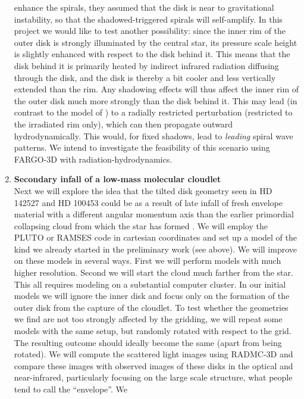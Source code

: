 \documentclass[10pt,fleqn,twoside]{article}
\begin{document}
\begin{enumerate}
  enhance the spirals, they assumed that the disk is near to gravitational
  instability, so that the shadowed-triggered spirals will self-amplify.  In
  this project we would like to test another possibility: since the inner
  rim of the outer disk is strongly illuminated by the central star, its
  pressure scale height is slightly enhanced with respect to the disk behind
  it. This means that the disk behind it is primarily heated by indirect
  infrared radiation diffusing through the disk, and the disk is thereby a
  bit cooler and less vertically extended than the rim. Any shadowing
  effects will thus affect the inner rim of the outer disk much more
  strongly than the disk behind it. This may lead (in contrast to the model
  of \citet{2016ApJ...823L...8M}) to a radially restricted perturbation
  (restricted to the irradiated rim only), which can then propagate outward
  hydrodynamically. This would, for fixed shadows, lead to {\em leading}
  spiral wave patterns. We intend to investigate the feasibility of this
  scenario using FARGO-3D with radiation-hydrodynamics. 
\item {\bf Secondary infall of a low-mass molecular cloudlet}\\
  Next we will explore the idea that the tilted disk geometry seen in HD
  142527 and HD 100453 could be as a result of late infall of fresh envelope
  material with a different angular momentum axis than the earlier
  primordial collapsing cloud from which the star has formed \citep[the
  scenario by][but now applied to disks]{2011MNRAS.417.1817T}. We will
  employ the PLUTO or RAMSES code in cartesian coordinates and set up a
  model of the kind we already started in the preliminary work (see above).
  We will improve on these models in several ways. First we will perform
  models with much higher resolution. Second we will start the cloud much
  farther from the star. This all requires modeling on a substantial computer
  cluster. In our initial models we will ignore the inner disk and focus
  only on the formation of the outer disk from the capture of the cloudlet.
  To test whether the geometries we find are not too strongly affected by
  the gridding, we will repeat some models with the same setup, but randomly
  rotated with respect to the grid. The resulting outcome should ideally
  become the same (apart from being rotated). We will compute the scattered
  light images using RADMC-3D and compare these images with observed images
  of these disks in the optical and near-infrared, particularly focusing on
  the large scale structure, what people tend to call the ``envelope''.  We

\end{enumerate}
\end{document}
